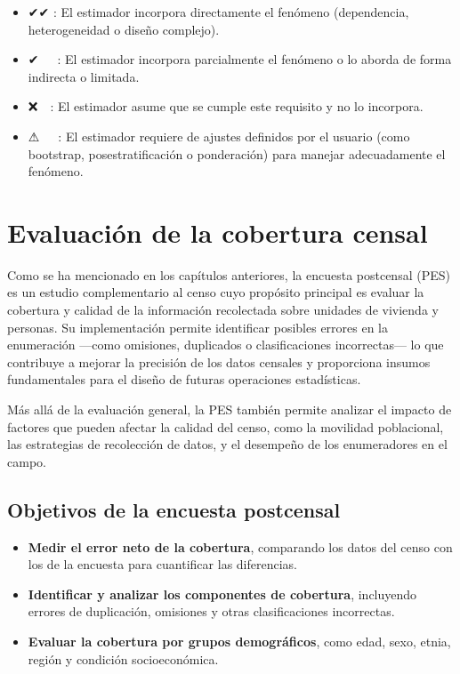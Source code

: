 \documentclass[
  12pt,
]{book}
\providecommand{\tightlist}{%
  \setlength{\itemsep}{0pt}\setlength{\parskip}{0pt}}
\begin{document}
\begin{itemize}
\tightlist
\item
  ✔✔ : El estimador incorpora directamente el fenómeno (dependencia, heterogeneidad o diseño complejo).
\item
  ✔~~~: El estimador incorpora parcialmente el fenómeno o lo aborda de forma indirecta o limitada.
\item
  ❌~~: El estimador asume que se cumple este requisito y no lo incorpora.
\item
  ⚠~~~: El estimador requiere de ajustes definidos por el usuario (como bootstrap, posestratificación o ponderación) para manejar adecuadamente el fenómeno.
\end{itemize}

\chapter{Evaluación de la cobertura censal}\label{evaluaciuxf3n-de-la-cobertura-censal}

Como se ha mencionado en los capítulos anteriores, la encuesta postcensal (PES) es un estudio complementario al censo cuyo propósito principal es evaluar la cobertura y calidad de la información recolectada sobre unidades de vivienda y personas. Su implementación permite identificar posibles errores en la enumeración ---como omisiones, duplicados o clasificaciones incorrectas--- lo que contribuye a mejorar la precisión de los datos censales y proporciona insumos fundamentales para el diseño de futuras operaciones estadísticas.

Más allá de la evaluación general, la PES también permite analizar el impacto de factores que pueden afectar la calidad del censo, como la movilidad poblacional, las estrategias de recolección de datos, y el desempeño de los enumeradores en el campo.

\section{Objetivos de la encuesta postcensal}\label{objetivos-de-la-encuesta-postcensal}

\begin{itemize}
\tightlist
\item
  \textbf{Medir el error neto de la cobertura}, comparando los datos del censo con los de la encuesta para cuantificar las diferencias.
\item
  \textbf{Identificar y analizar los componentes de cobertura}, incluyendo errores de duplicación, omisiones y otras clasificaciones incorrectas.
\item
  \textbf{Evaluar la cobertura por grupos demográficos}, como edad, sexo, etnia, región y condición socioeconómica.
\end{itemize}
\end{document}
